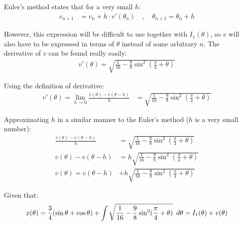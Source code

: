 \documentclass[12pt]{article}
\newcommand{\Hquad}{\hspace{0.5em}}
\begin{document}
        Euler's method states that for a very small $h$:
        \begin{align}
            v_{n+1} &= v_n + h \cdot v'(\theta_n) \quad , \quad
            \theta_{n+1} = \theta_n +h
        \end{align}

        However, this expression will be difficult to use together with $I_1(\theta)$, so $v$ will also have to be expressed in terms of $\theta$ instead of some arbitrary $n$. The derivative of $v$ can be found really easily:
        \begin{align}
            v'(\theta) = \sqrt{\frac{1}{16} - \frac{9}{8} \sin^2 (\frac{\pi}{4}+\theta)}
        \end{align}

        Using the definition of derivative:
        \begin{align}
            v'(\theta) = \lim\limits_{h \to 0} \frac{v(\theta)-v(\theta-h)}{h} &= \sqrt{\frac{1}{16} - \frac{9}{8} \sin^2 (\frac{\pi}{4}+\theta)}
        \end{align}

        Approximating $h$ in a similar manner to the Euler's method ($h$ is a very small number):
        \begin{align}
            \frac{v(\theta)-v(\theta-h)}{h} &= \sqrt{\frac{1}{16} - \frac{9}{8} \sin^2 (\frac{\pi}{4}+\theta)} \\
            v(\theta)-v(\theta-h) &= h \sqrt{\frac{1}{16} - \frac{9}{8} \sin^2 (\frac{\pi}{4}+\theta)} \\
            v(\theta) = v(\theta-h) &+ h \sqrt{\frac{1}{16} - \frac{9}{8} \sin^2 (\frac{\pi}{4}+\theta)}
        \end{align}


 
        Given that:
        \begin{equation}
            x(\theta) = \frac{3}{4} (\sin\theta + \cos\theta) + \int \sqrt{\frac{1}{16} - \frac{9}{8} \sin^2 (\frac{\pi}{4}+\theta)} \Hquad d\theta = I_1(\theta) + v(\theta)
        \end{equation}
\end{document}
